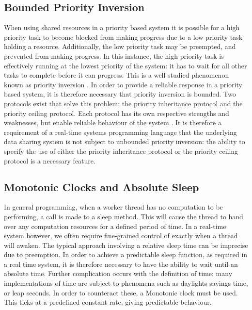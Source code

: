 \subsection{Bounded Priority Inversion}
When using shared resources in a priority based system it is possible for 
a high priority task to become blocked from making progress due to a low
priority task holding a resource. Additionally, the low priority task may be 
preempted, and prevented from making progress. In this instance, the high priority task is 
effectively running at the lowest priority of the system: it has to wait for all other 
tasks to complete before it can progress. This is a well studied phenomenon known 
as priority inversion 
\cite{Burns and Welling page..}. 
In order to provide a reliable response in a priority based system, it is 
therefore necessary that priority inversion is bounded.
Two protocols exist that solve this problem: the priority inheritance protocol 
and the priority ceiling protocol. Each protocol has its own respective 
strengths and weaknesses, but enable reliable behaviour of the system 
\cite{books.google.co.uk/books?id=coPT7vaEjFsC&pg=PA87}.
It is therefore a requirement of a real-time systems programming language 
that the underlying data sharing system is not subject to unbounded priority 
inversion: the ability to specify the use of either the priority inheritance 
protocol or the priority ceiling protocol is a necessary feature.  

\subsection{Monotonic Clocks and Absolute Sleep}
In general programming, when a worker thread has no computation to be 
performing, a call is made to a sleep method. This will cause the thread
to hand over any computation resources for a defined period of time. In a 
real-time system however, we often require fine-grained control of exactly
when a thread will awaken. The typical approach involving a relative sleep 
time can be imprecise due to preemption. In order to achieve a predictable 
sleep function, as required in a real time system, it is therefore necessary 
to have the ability to wait until an absolute time. Further complication 
occurs with the definition of time: many implementations of time are subject 
to phenomena such as daylights savings time, or leap seconds. 
In order to counteract these, a Monotonic clock must be used. This ticks at a 
predefined constant rate, giving predictable behaviour. 


